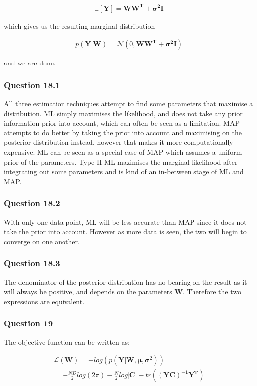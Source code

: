 \documentclass[10pt, a4paper, twocolumn]{article} %
\begin{document}
\begin{align}
  \mathbb{E}[\mathbf{Y}] = \mathbf{WW^T + \sigma^2I}
\end{align}

which gives us the resulting marginal distribution

\begin{align}
  p(\mathbf{Y|W}) = \mathcal{N}(0, \mathbf{WW^T + \sigma^2I})
\end{align}

and we are done.

\subsubsection*{Question 18.1}
All three estimation techniques attempt to find some parameters that maximise a distribution. ML simply maximises the likelihood, and does not take any prior information prior into account, which can often be seen as a limitation. MAP attempts to do better by taking the prior into account and maximising on the posterior distribution instead, however that makes it more computationally expensive. ML can be seen as a special case of MAP which assumes a uniform prior of the parameters. Type-II ML maximises the marginal likelihood after integrating out some parameters and is kind of an in-between stage of ML and MAP.

\subsubsection*{Question 18.2}
With only one data point, ML will be less accurate than MAP since it does not take the prior into account. However as more data is seen, the two will begin to converge on one another. 

\subsubsection*{Question 18.3}
The denominator of the posterior distribution has no bearing on the result as it will always be positive, and depends on the parameters $\mathbf{W}$.  Therefore the two expressions are equivalent.

\subsubsection*{Question 19}

The objective function can be written as:

\begin{multline}
  \mathcal{L}(\mathbf{W}) = -log(p(\mathbf{Y}|\mathbf{W}, \bm{\mu}, \bm{\sigma}^2)) \\
  = -\frac{ND}{2}log(2\pi) - \frac{N}{2}log|\mathbf{C}| - tr(\mathbf{(YC)^{-1}Y^T})
\end{multline}
\end{document}
